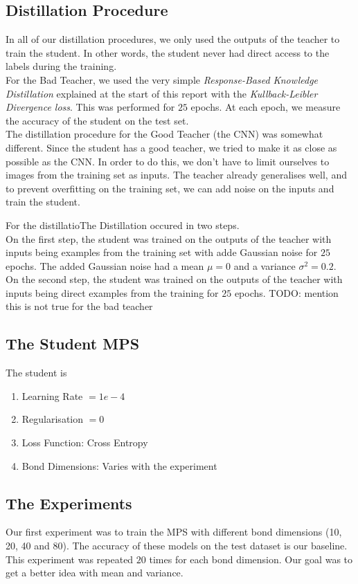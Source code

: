 \documentclass{article}
\theoremstyle{definition}
\theoremstyle{definition}
\begin{document}
\subsection{Distillation Procedure}
In all of our distillation procedures, we only used the outputs of the teacher to train the student. In other words, the student never had direct access to the labels during the training. \\
For the Bad Teacher, we used the very simple \emph{Response-Based Knowledge Distillation} explained at the start of this report with the \emph{Kullback-Leibler Divergence loss}. This was performed for $25$ epochs. At each epoch, we measure the accuracy of the student on the test set. \\
The distillation procedure for the Good Teacher (the CNN) was somewhat different. Since the student has a good teacher, we tried to make it as close as possible as the CNN. In order to do this, we don't have to limit ourselves to images from the training set as inputs. The teacher already generalises well, and to prevent overfitting on the training set, we can add noise on the inputs and train the student.

For the distillatioThe Distillation occured in two steps. \\ On the first step, the student was trained on the outputs of the teacher with inputs being examples from the training set with adde Gaussian noise for $25$ epochs. The added Gaussian noise had a mean $\mu=0$ and a variance $\sigma^2=0.2$. \\ On the second step, the student was trained on the outputs of the teacher with inputs being direct examples from the training for $25$ epochs.
TODO: mention this is not true for the bad teacher

\subsection{The Student MPS}
The student is 
\begin{enumerate}
    \item Learning Rate $= 1e-4$
    \item Regularisation $= 0$
    \item Loss Function: Cross Entropy
    \item Bond Dimensions: Varies with the experiment
\end{enumerate}

\subsection{The Experiments}
Our first experiment was to train the MPS with different bond dimensions (10, 20, 40 and 80). The accuracy of these models on the test dataset is our baseline. This experiment was repeated $20$ times for each bond dimension. Our goal was to get a better idea with mean and variance.
\end{document}
